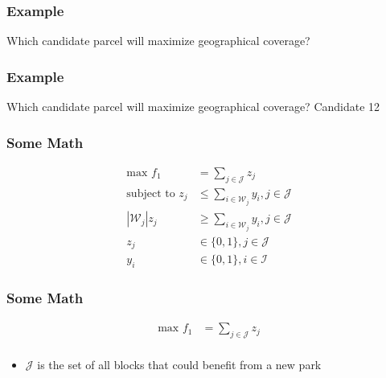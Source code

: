 \documentclass[10pt, compress]{beamer}
\begin{document}
\begin{frame}[fragile]
  \frametitle{Example}
  \begin{center}
\end{center}
\begin{block}{Which candidate parcel will maximize geographical coverage?}
\end{block}
\end{frame}

\begin{frame}[fragile]
  \frametitle{Example}
  \begin{center}
\end{center}
\begin{block}{Which candidate parcel will maximize geographical coverage?}
\alert{Candidate 12}
\end{block}
\end{frame}

\begin{frame}[fragile]
\frametitle{Some Math}
\begin{align*}
\textrm{max } f_1 &= \sum_{j \in \mathcal{J}} z_j \\
\textrm{subject to } z_j &\leq \sum_{i \in \mathcal{W}_j} y_i, j \in \mathcal{J}\\
\left|\mathcal{W}_j\right|z_j &\geq \sum_{i \in \mathcal{W}_j} y_i, j \in \mathcal{J} \\
z_j &\in \{0,1\}, j \in \mathcal{J} \\
y_i &\in \{0,1\}, i \in \mathcal{I}
\end{align*}
\end{frame}

\begin{frame}[fragile]
\frametitle{Some Math}
\begin{align*}
\textrm{max } f_1 &= \sum_{j \in \mathcal{J}} z_j \\
\end{align*}
\begin{itemize}
\item $\mathcal{J}$ is the set of all blocks that could benefit from a new park 
\end{itemize}
\end{frame}
\end{document}
